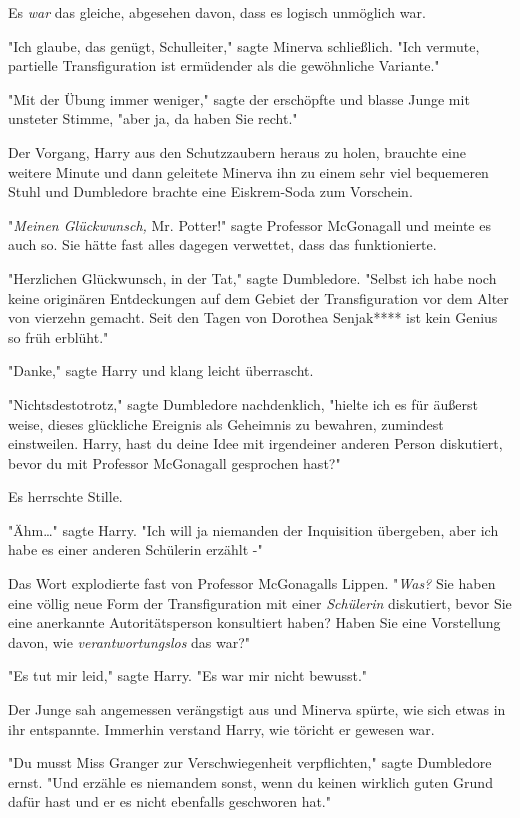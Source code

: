 {Es \emph{war} das gleiche, abgesehen davon, dass es logisch unmöglich war.

"Ich glaube, das genügt, Schulleiter," sagte Minerva schließlich. "Ich vermute, partielle Transfiguration ist ermüdender als die gewöhnliche Variante."

"Mit der Übung immer weniger," sagte der erschöpfte und blasse Junge mit unsteter Stimme, "aber ja, da haben Sie recht."

Der Vorgang, Harry aus den Schutzzaubern heraus zu holen, brauchte eine weitere Minute und dann geleitete Minerva ihn zu einem sehr viel bequemeren Stuhl und Dumbledore brachte eine Eiskrem-Soda zum Vorschein.

"\emph{Meinen Glückwunsch,} Mr. Potter!" sagte Professor McGonagall und meinte es auch so. Sie hätte fast alles dagegen verwettet, dass das funktionierte.

"Herzlichen Glückwunsch, in der Tat," sagte Dumbledore. "Selbst ich habe noch keine originären Entdeckungen auf dem Gebiet der Transfiguration vor dem Alter von vierzehn gemacht. Seit den Tagen von Dorothea Senjak**** ist kein Genius so früh erblüht."

"Danke," sagte Harry und klang leicht überrascht.

"Nichtsdestotrotz," sagte Dumbledore nachdenklich, "hielte ich es für äußerst weise, dieses glückliche Ereignis als Geheimnis zu bewahren, zumindest einstweilen. Harry, hast du deine Idee mit irgendeiner anderen Person diskutiert, bevor du mit Professor McGonagall gesprochen hast?"

Es herrschte Stille.

"Ähm…" sagte Harry. "Ich will ja niemanden der Inquisition übergeben, aber ich habe es einer anderen Schülerin erzählt -"

Das Wort explodierte fast von Professor McGonagalls Lippen. "\emph{Was?} Sie haben eine völlig neue Form der Transfiguration mit einer \emph{Schülerin} diskutiert, bevor Sie eine anerkannte Autoritätsperson konsultiert haben? Haben Sie eine Vorstellung davon, wie \emph{verantwortungslos} das war?"

"Es tut mir leid," sagte Harry. "Es war mir nicht bewusst."

Der Junge sah angemessen verängstigt aus und Minerva spürte, wie sich etwas in ihr entspannte. Immerhin verstand Harry, wie töricht er gewesen war.

"Du musst Miss Granger zur Verschwiegenheit verpflichten," sagte Dumbledore ernst. "Und erzähle es niemandem sonst, wenn du keinen wirklich guten Grund dafür hast und er es nicht ebenfalls geschworen hat."

}
